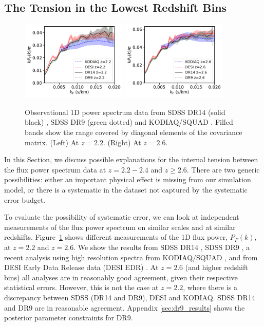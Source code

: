 \subsection{The Tension in the Lowest Redshift Bins}
\label{sec:tension}

\begin{figure}
    \centering
    \includegraphics[width=0.45\textwidth]{figures/lymandata-z2.2.pdf}
    \includegraphics[width=0.45\textwidth]{figures/lymandata-z2.6.pdf}
    \caption{\label{fig:p1d_data}
    Observational 1D power spectrum data from SDSS DR14 (solid black) \protect\cite{2019JCAP...07..017C}, SDSS DR9 (green dotted) \protect\cite{2013A&A...559A..85P} and KODIAQ/SQUAD \protect\cite{2022MNRAS.509.2842K}.
    Filled bands show the range covered by diagonal elements of the covariance matrix.
    (Left) At $z=2.2$.
    (Right) At $z=2.6$.}
\end{figure}

In this Section, we discuss possible explanations for the internal tension between the flux power spectrum data at $z=2.2 - 2.4$ and $z \geq 2.6$.
There are two generic possibilities: either an important physical effect is missing from our simulation model, or there is a systematic in the dataset not captured by the systematic error budget. 

To evaluate the possibility of systematic error, we can look at independent measurements of the flux power spectrum on similar scales and at similar redshifts.
Figure~\ref{fig:p1d_data} shows different measurements of the 1D flux power, $P_F(k)$, at $z=2.2$ and $z=2.6$.
We show the results from SDSS DR14 \cite{2019JCAP...07..017C}, SDSS DR9 \cite{2013A&A...559A..85P}, a recent analysis using high resolution spectra from KODIAQ/SQUAD \cite{2022MNRAS.509.2842K}, and from DESI Early Data Release data (DESI EDR) \cite{2023arXiv230606316G}.
At $z=2.6$ (and higher redshift bins) all analyses are in reasonably good agreement, given their respective statistical errors.
However, this is not the case at $z=2.2$, where there is a discrepancy between SDSS (DR14 and DR9), DESI and KODIAQ.
SDSS DR14 and DR9 are in reasonable agreement.
Appendix \ref{sec:dr9_results} shows the posterior parameter constraints for DR9.

